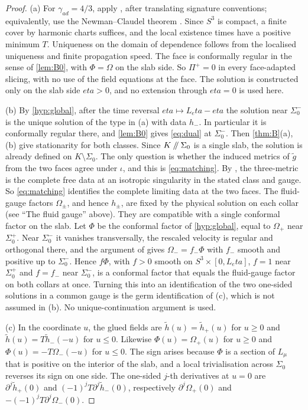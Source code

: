 \documentclass[11pt]{article}
\theoremstyle{canonmath}
\theoremstyle{canonpostulate}
\theoremstyle{canonproposition}
\theoremstyle{canonmath}
\theoremstyle{canonproposition}
\providecommand{\cutK}{\Klein\mathbin{/\mkern-5mu/}\Sigma_0}
\providecommand{\Lmu}{\mathcal{L}_\mu}
\providecommand{\Klein}{\mathcal{K}}
\def\mathrm#1{#1}%
\def\mathcal#1{#1}%
\def\eta{eta}%
\begin{document}
\begin{proof}
(a) For $\gamma_{\mathrm{ad}} = 4/3$, apply \cite[§4]{AnguigeTod1999a}, after translating signature conventions; equivalently, use the Newman--Claudel theorem \cite{Newman1993b,ClaudelNewman1998}. Since $S^3$ is compact, a finite cover by harmonic charts suffices, and the local existence times have a positive minimum $T$. Uniqueness on the domain of dependence follows from the localised uniqueness and finite propagation speed. The face is conformally regular in the sense of \cref{lem:B0}, with $\Phi = \Omega$ on the slab side. So $\Pi^+ = 0$ in every face-adapted slicing, with no use of the field equations at the face. The solution is constructed only on the slab side $\eta>0$, and no extension through $\eta = 0$ is used here.

(b) By \ref{hyp:global}, after the time reversal $\eta\mapsto L_\eta-\eta$ the solution near $\Sigma_0^-$ is the unique solution of the type in (a) with data $h_-$. In particular it is conformally regular there, and \cref{lem:B0} gives \eqref{eq:dual} at $\Sigma_0^-$. Then \cref{thm:B}(a),(b) give stationarity for both classes. Since $\cutK$ is a single slab, the solution is already defined on $\Klein\setminus\Sigma_0$. The only question is whether the induced metrics of $\tilde g$ from the two faces agree under $\iota$, and this is \eqref{eq:matching}. By \cite{AnguigeTod1999a}, the three-metric is the complete free data at an isotropic singularity in the stated class and gauge. So \eqref{eq:matching} identifies the complete limiting data at the two faces. The fluid-gauge factors $\Omega_\pm$, and hence $h_\pm$, are fixed by the physical solution on each collar (see ``The fluid gauge'' above). They are compatible with a single conformal factor on the slab. Let $\Phi$ be the conformal factor of \ref{hyp:global}, equal to $\Omega_+$ near $\Sigma_0^+$. Near $\Sigma_0^-$ it vanishes transversally, the rescaled velocity is regular and orthogonal there, and the argument of \cite[Lemma~3.1]{AnguigeTod1999a} gives $\Omega_- = f_-\Phi$ with $f_-$ smooth and positive up to $\Sigma_0^-$. Hence $f\Phi$, with $f>0$ smooth on $S^3\times[0,L_\eta]$, $f = 1$ near $\Sigma_0^+$ and $f = f_-$ near $\Sigma_0^-$, is a conformal factor that equals the fluid-gauge factor on both collars at once. Turning this into an identification of the two one-sided solutions in a common gauge is the germ identification of (c), which is not assumed in (b). No unique-continuation argument is used.

(c) In the coordinate $u$, the glued fields are $\tilde h(u) = \tilde h_+(u)$ for $u\ge0$ and $\tilde h(u) = T\tilde h_-(-u)$ for $u\le0$. Likewise $\Phi(u) = \Omega_+(u)$ for $u\ge0$ and $\Phi(u) = -T\Omega_-(-u)$ for $u\le0$. The sign arises because $\Phi$ is a section of $\Lmu$ that is positive on the interior of the slab, and a local trivialisation across $\Sigma_0$ reverses its sign on one side. The one-sided $j$-th derivatives at $u = 0$ are $\partial^j\tilde h_+(0)$ and $(-1)^jT\partial^j\tilde h_-(0)$, respectively $\partial^j\Omega_+(0)$ and $-(-1)^jT\partial^j\Omega_-(0)$.


\end{proof}
\end{document}
